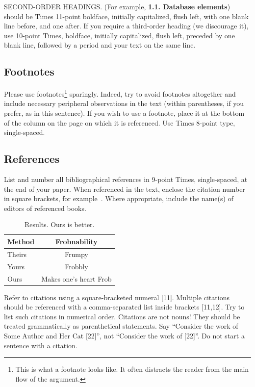 \documentclass[10pt,twocolumn,letterpaper]{article}
\begin{document}
SECOND-ORDER HEADINGS. (For example, { \bf 1.1. Database elements}) 
should be Times 11-point boldface, initially capitalized, flush left, 
with one blank line before, and one after. If you require a third-order 
heading (we discourage it), use 10-point Times, boldface, initially 
capitalized, flush left, preceded by one blank line, followed by a period 
and your text on the same line.

\subsection{Footnotes}

Please use footnotes\footnote {This is what a footnote looks like.  It
often distracts the reader from the main flow of the argument.} sparingly.
Indeed, try to avoid footnotes altogether and include necessary peripheral
observations in 
the text (within parentheses, if you prefer, as in this sentence).  If you
wish to use a footnote, place it at the bottom of the column on the page on
which it is referenced. Use Times 8-point type, single-spaced.


\subsection{References}

List and number all bibliographical references in 9-point Times,
single-spaced, at the end of your paper. When referenced in the text,
enclose the citation number in square brackets, for
example~\cite{Authors06}.  Where appropriate, include the name(s) of
editors of referenced books.

\begin{table}
\begin{center}
\begin{tabular}{|l|c|}
\hline
Method & Frobnability \\
\hline\hline
Theirs & Frumpy \\
Yours & Frobbly \\
Ours & Makes one's heart Frob\\
\hline
\end{tabular}
\end{center}
\caption{Results.   Ours is better.}
\end{table}


Refer to citations using a square-bracketed numeral [11].
Multiple citations should be referenced with a comma-separated
list inside brackets [11,12].   Try to list
such citations in numerical order.   Citations are not nouns! 
They should be treated grammatically as parenthetical statements.
Say ``Consider the work of Some Author and Her Cat [22]'',
not ``Consider the work of [22]''.   Do not start
a sentence with a citation.
\end{document}
